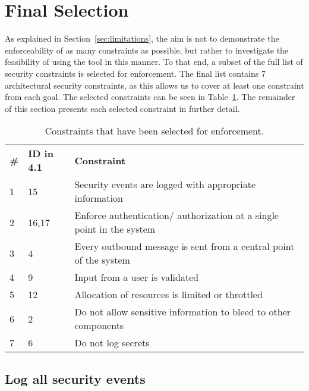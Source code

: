 \section{Final Selection}

As explained in Section~\ref{sec:limitations}, the aim is not to demonstrate the enforceability of as many constraints as possible, but rather to investigate the feasibility of using the tool in this manner. To that end, a subset of the full list of security constraints is selected for enforcement. The final list contains 7 architectural security constraints, as this allows us to cover at least one constraint from each goal. The selected constraints can be seen in Table~\ref{tab:selected_measures}. The remainder of this section presents each selected constraint in further detail.

\begin{table}
\begin{tabular}{llp{11cm}}
\hline
\textbf{\#} & \textbf{ID in 4.1} & \textbf{Constraint} \\
1 & 15 & Security events are logged with appropriate information\\
\rowcolor{RowColor}
2 & 16,17 & Enforce authentication/ authorization at a single point in the system\\
3 & 4 & Every outbound message is sent from a central point of the system\\
\rowcolor{RowColor}
4 & 9 & Input from a user is validated\\
5 & 12 & Allocation of resources is limited or throttled\\
\rowcolor{RowColor}
6 & 2 & Do not allow sensitive information to bleed to other components\\
7 & 6 & Do not log secrets\\
\hline
\end{tabular}
\caption{Constraints that have been selected for enforcement.}
\label{tab:selected_measures}
\end{table}


\subsection{Log all security events} 

